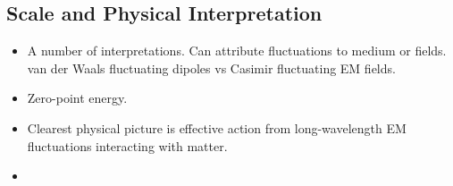 



\subsection{Scale and Physical Interpretation}


\begin{itemize}
  \item A number of interpretations.  Can attribute fluctuations to medium or fields.  
    van der Waals fluctuating dipoles vs Casimir fluctuating EM fields.  
  \item Zero-point energy.  
  \item Clearest physical picture is effective action from long-wavelength EM fluctuations 
    interacting with matter.
  \item 
\end{itemize}



